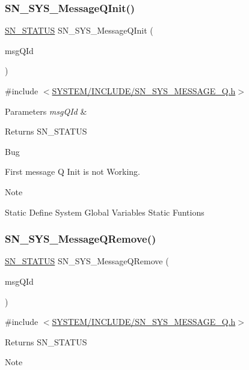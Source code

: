 \subsubsection{\texorpdfstring{S\+N\+\_\+\+S\+Y\+S\+\_\+\+Message\+Q\+Init()}{SN\_SYS\_MessageQInit()}}
{\footnotesize\ttfamily \hyperlink{group__SYSTEM__ERROR_ga4540713b9a7a18ce44d78c3a10f7442f}{S\+N\+\_\+\+S\+T\+A\+T\+US} S\+N\+\_\+\+S\+Y\+S\+\_\+\+Message\+Q\+Init (\begin{DoxyParamCaption}\item[{\hyperlink{structsys__message__queue}{sys\+Message\+Q\+Id} $\ast$}]{msg\+Q\+Id }\end{DoxyParamCaption})}



{\ttfamily \#include $<$\hyperlink{SN__SYS__MESSAGE__Q_8h}{S\+Y\+S\+T\+E\+M/\+I\+N\+C\+L\+U\+D\+E/\+S\+N\+\_\+\+S\+Y\+S\+\_\+\+M\+E\+S\+S\+A\+G\+E\+\_\+\+Q.\+h}$>$}


\begin{DoxyParams}{Parameters}
{\em msg\+Q\+Id} & \\
\hline
\end{DoxyParams}
\begin{DoxyReturn}{Returns}
S\+N\+\_\+\+S\+T\+A\+T\+US
\end{DoxyReturn}
\begin{DoxyRefDesc}{Bug}
\item[\hyperlink{bug__bug000001}{Bug}]First message Q Init is not Working. \end{DoxyRefDesc}
\begin{DoxyNote}{Note}

\end{DoxyNote}
Static Define System Global Variables Static Funtions \mbox{\label{group__SYSTEM__MESSAGE__Q_ga293a77ea597b70f3f2f38b919f93497e}} 
\subsubsection{\texorpdfstring{S\+N\+\_\+\+S\+Y\+S\+\_\+\+Message\+Q\+Remove()}{SN\_SYS\_MessageQRemove()}}
{\footnotesize\ttfamily \hyperlink{group__SYSTEM__ERROR_ga4540713b9a7a18ce44d78c3a10f7442f}{S\+N\+\_\+\+S\+T\+A\+T\+US} S\+N\+\_\+\+S\+Y\+S\+\_\+\+Message\+Q\+Remove (\begin{DoxyParamCaption}\item[{\hyperlink{structsys__message__queue}{sys\+Message\+Q\+Id} $\ast$}]{msg\+Q\+Id }\end{DoxyParamCaption})}



{\ttfamily \#include $<$\hyperlink{SN__SYS__MESSAGE__Q_8h}{S\+Y\+S\+T\+E\+M/\+I\+N\+C\+L\+U\+D\+E/\+S\+N\+\_\+\+S\+Y\+S\+\_\+\+M\+E\+S\+S\+A\+G\+E\+\_\+\+Q.\+h}$>$}

\begin{DoxyReturn}{Returns}
S\+N\+\_\+\+S\+T\+A\+T\+US
\end{DoxyReturn}
\begin{DoxyNote}{Note}

\end{DoxyNote}
